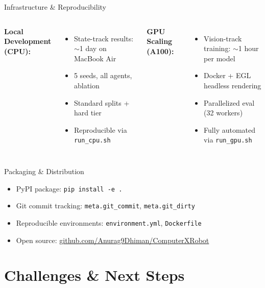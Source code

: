 \documentclass[10pt,aspectratio=16:9]{beamer}
\begin{document}
\begin{frame}{Infrastructure \& Reproducibility}
  \begin{columns}
    \textbf{Local Development (CPU):}
    \begin{itemize}
      \item State-track results: $\sim$1 day on MacBook Air
      \item 5 seeds, all agents, ablation
      \item Standard splits + hard tier
      \item Reproducible via \texttt{run\_cpu.sh}
    \end{itemize}

    \textbf{GPU Scaling (A100):}
    \begin{itemize}
      \item Vision-track training: $\sim$1 hour per model
      \item Docker + EGL headless rendering
      \item Parallelized eval (32 workers)
      \item Fully automated via \texttt{run\_gpu.sh}
    \end{itemize}
  \end{columns}

  \vspace{1em}

  \begin{block}{Packaging \& Distribution}
    \vspace{0.2em}
    \begin{itemize}
      \item PyPI package: \texttt{pip install -e .}
      \item Git commit tracking: \texttt{meta.git\_commit}, \texttt{meta.git\_dirty}
      \item Reproducible environments: \texttt{environment.yml}, \texttt{Dockerfile}
      \item Open source: \url{github.com/Anurag9Dhiman/ComputerXRobot}
    \end{itemize}
    \vspace{0.2em}
  \end{block}
\end{frame}

\section{Challenges \& Next Steps}
\end{document}
